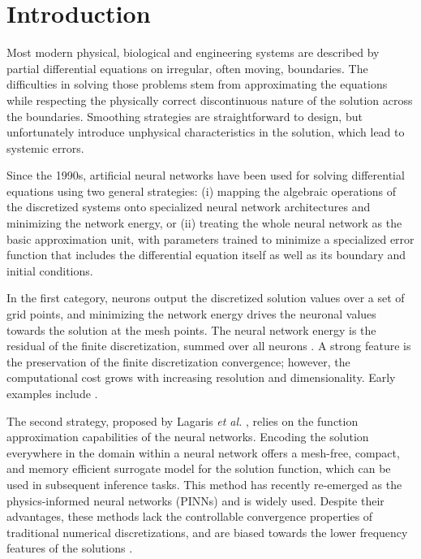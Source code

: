 \documentclass{article}
\begin{document}
\section{Introduction}
Most modern physical, biological and engineering systems are described by partial differential equations on irregular, often moving, boundaries. The difficulties in solving those problems stem from approximating the equations while respecting the physically correct discontinuous nature of the solution across the boundaries. Smoothing strategies are straightforward to design, but unfortunately introduce unphysical characteristics in the solution, which lead to systemic errors.

Since the 1990s, artificial neural networks have been used for solving differential equations using two general strategies: (i) mapping the algebraic operations of the discretized systems onto specialized neural network architectures and minimizing the network energy, or (ii) treating the whole neural network as the basic approximation unit, with parameters trained to minimize a specialized error function that includes the differential equation itself as well as its boundary and initial conditions. 

In the first category, neurons output the discretized solution values over a set of grid points, and minimizing the network energy drives the neuronal values towards the solution at the mesh points. The neural network energy is the residual of the finite discretization, summed over all neurons \cite{lee1990neural}. A strong feature is the preservation of the finite discretization convergence; however, the computational cost grows with increasing resolution and dimensionality. Early examples include \cite{gobovic1993design,chua1988cellular,chua1988cellularA}.

The second strategy, proposed by Lagaris \textit{et al.} \cite{lagaris1998artificial}, relies on the function approximation capabilities of the neural networks. Encoding the solution everywhere in the domain within a neural network offers a mesh-free, compact, and memory efficient surrogate model for the solution function, which can be used in subsequent inference tasks. This method has recently re-emerged as the physics-informed neural networks (PINNs) \cite{RAISSI2019686} and is widely used. Despite their advantages, these methods lack the controllable convergence properties of traditional numerical discretizations, and are biased towards the lower frequency features of the solutions \cite{wang2022and,rahaman2019spectral}.
\end{document}
